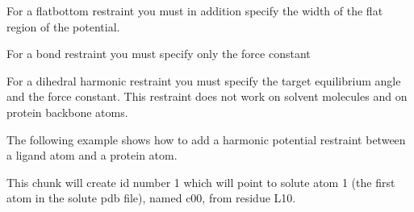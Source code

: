 \documentclass[letterpaper,10pt,english]{sphinxmanual}
\begin{document}
%
\begin{sphinxVerbatim}[commandchars=\\\{\}]
          
\end{sphinxVerbatim}

For a flatbottom restraint you must in addition specify the width of the flat region of the potential.

\ignorespaces 
\def\sphinxLiteralBlockLabel{\label{\detokenize{protoms:index-78}}}
%
\begin{sphinxVerbatim}[commandchars=\\\{\}]
      
\end{sphinxVerbatim}

For a bond restraint you must specify only the force constant

\ignorespaces 
\def\sphinxLiteralBlockLabel{\label{\detokenize{protoms:index-79}}}
%
\begin{sphinxVerbatim}[commandchars=\\\{\}]
       
\end{sphinxVerbatim}

For a dihedral harmonic restraint you must specify the target equilibrium angle and the force constant. This restraint does not work on solvent molecules and on protein backbone atoms.

The following example shows how to add a harmonic potential restraint between a ligand atom and a protein atom.

%
\begin{sphinxVerbatim}[commandchars=\\\{\}]
       
\end{sphinxVerbatim}

This chunk will create id number 1 which will point to solute atom 1 (the first atom in the solute pdb file), named c00, from residue L10.
\end{document}
